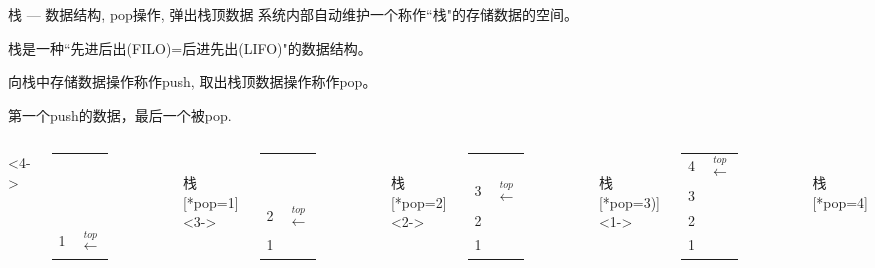 \begin{frame}{栈 --- 数据结构, pop操作, 弹出栈顶数据}
系统内部自动维护一个称作``栈"的存储数据的空间。

栈是一种``先进后出(FILO)=后进先出(LIFO)"的数据结构。

向栈中存储数据操作称作push, 取出栈顶数据操作称作pop。

第一个push的数据，最后一个被pop.
\begin{columns}[T]
	<4->
	\begin{tabular}{|c|l}
		\cline{1-1}
		~&\\
		\cline{1-1}
		~&\\
		\cline{1-1}
		~&\\
		\cline{1-1} 
		\cellcolor{yellow}1&$\xleftarrow{top}$ \\ 
		\cline{1-1} 
	\end{tabular}\\ 
	栈[*pop=1]
	<3->
	\begin{tabular}{|c|l}
		\cline{1-1}
		~&\\
		\cline{1-1}
		~&\\
		\cline{1-1} 
		\cellcolor{yellow}2 &$\xleftarrow{top}$ \\ 
		\cline{1-1} 
		1 &\\ 
		\cline{1-1}
	\end{tabular}\\ 
	栈[*pop=2]
	<2->
	\begin{tabular}{|c|l}
		\cline{1-1}
		~&\\
		\cline{1-1}
		\cellcolor{yellow}3 &$\xleftarrow{top}$ \\ 
		\cline{1-1}
		2 &\\ 
		\cline{1-1}
		1 &\\ 
		\cline{1-1}
	\end{tabular}\\ 
	栈[*pop=3)]
	<1->
	\begin{tabular}{|c|l}
		\cline{1-1}
		\cellcolor{yellow}4 &$\xleftarrow{top}$ \\ 
		\cline{1-1} 
		3 &\\ 
		\cline{1-1}
		2 &\\ 
		\cline{1-1} 
		1 &\\ 
		\cline{1-1}
	\end{tabular}\\
	栈[*pop=4] 
\end{columns}
\end{frame}

